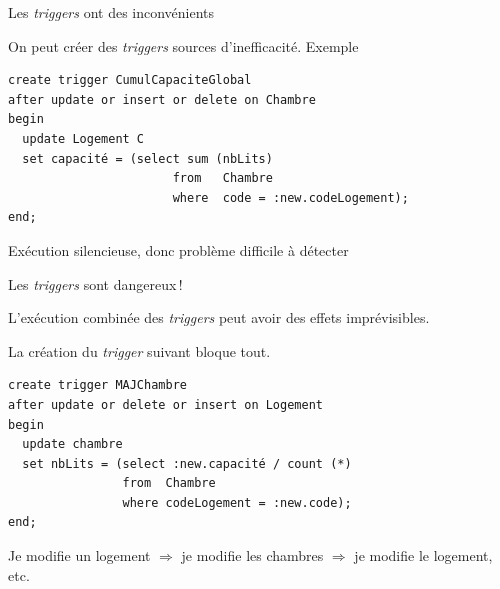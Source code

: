 \begin{frame}[fragile]{Les \textit{triggers} ont des inconvénients}

On peut créer des \textit{triggers} sources d'inefficacité.  Exemple

\small

\begin{small}
\begin{verbatim}
create trigger CumulCapaciteGlobal
after update or insert or delete on Chambre
begin
  update Logement C 
  set capacité = (select sum (nbLits) 
                       from   Chambre 
                       where  code = :new.codeLogement);
end;
\end{verbatim}
\end{small}
\vfill

Exécution silencieuse, donc problème difficile à détecter
\end{frame}



\begin{frame}[fragile]{Les \textit{triggers} sont dangereux\,!}

L'exécution combinée des \textit{triggers} peut avoir  des effets imprévisibles.

\vfill

La création du \textit{trigger} suivant  \alert{bloque} tout. 
\vfill

\begin{small}
\begin{verbatim}
create trigger MAJChambre
after update or delete or insert on Logement
begin
  update chambre
  set nbLits = (select :new.capacité / count (*)
                from  Chambre
                where codeLogement = :new.code);
end;
\end{verbatim}
\end{small}

\vfill

Je modifie un logement $\Rightarrow$ je modifie les chambres  $\Rightarrow$
je modifie le logement, etc. 
\end{frame}



